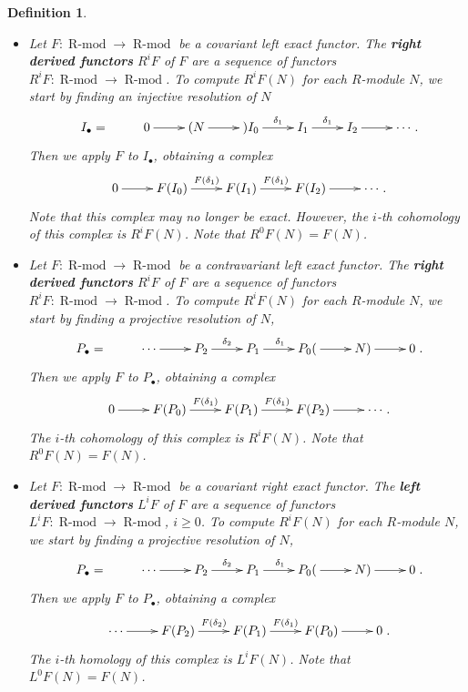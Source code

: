 \documentclass[11pt]{book}
\newtheorem{definition}[theorem]{Definition}
\numberwithin{equation}{section}
\numberwithin{theorem}{chapter}
\theoremstyle{definition}
\newtheorem*{basic properties}{Basic Properties}
\newtheorem*{Important Remark}{Important Remark}
\theoremstyle{remark}
\newcommand{\Rmod}{\operatorname{R-mod}}
\begin{document}
\begin{definition}$\,$

\begin{itemize}
	\item Let $F: \Rmod \longrightarrow \Rmod$ be a covariant left exact functor. The {\bf right derived functors} $R^iF$ of $F$ are a sequence of functors $R^iF\!:  \Rmod \longrightarrow \Rmod$. To compute $R^iF(N)$ for each $R$-module $N$, we start by finding an injective resolution of $N$
	$$\xymatrix{I_\bullet = & 0 \ar[r] & (N \ar[r] &) I_{0} \ar[r]^-{\delta_{1}} & I_1 \ar[r]^{\delta_1} & I_{2} \ar[r] & \cdots}.$$
	Then we apply $F$ to $I_{\bullet}$, obtaining a complex
	$$\xymatrix{0 \ar[r] & F(I_{0}) \ar[r]^-{F(\delta_{1})} & F(I_1) \ar[r]^{F(\delta_1)} & F(I_{2}) \ar[r] & \cdots}.$$
	Note that this complex may no longer be exact. However, the $i$-th cohomology of this complex is $R^iF(N)$. Note that $R^0F(N) = F(N)$.

	
	\item Let $F\!: \Rmod \longrightarrow \Rmod$ be a contravariant left exact functor. The {\bf right derived functors} $R^iF$ of $F$ are a sequence of functors $R^iF\!:  \Rmod \longrightarrow \Rmod$. To compute $R^iF(N)$ for each $R$-module $N$, we start by finding a projective resolution of $N$,
	$$\xymatrix{P_\bullet = & \cdots \ar[r] & P_{2} \ar[r]^-{\delta_{2}} & P_1 \ar[r]^{\delta_1} & P_{0} (\ar[r] & N ) \ar[r] & 0}.$$
	Then we apply $F$ to $P_{\bullet}$, obtaining a complex
	$$\xymatrix{0 \ar[r] & F(P_{0}) \ar[r]^-{F(\delta_{1})} & F(P_1) \ar[r]^{F(\delta_1)} & F(P_{2}) \ar[r] & \cdots}.$$
	The $i$-th cohomology of this complex is $R^iF(N)$. Note that $R^0F(N) = F(N)$.
	
	
	\item Let $F\!: \Rmod \longrightarrow \Rmod$ be a covariant right exact functor. The {\bf left derived functors} $L^iF$ of $F$ are a sequence of functors $L^iF\!:  \Rmod \longrightarrow \Rmod$, $i \geqslant 0$. To compute $R^iF(N)$ for each $R$-module $N$, we start by finding a projective resolution of $N$,
	$$\xymatrix{P_\bullet = & \cdots \ar[r] & P_{2} \ar[r]^-{\delta_{2}} & P_1 \ar[r]^{\delta_1} & P_{0} (\ar[r] & N ) \ar[r] & 0}.$$
	Then we apply $F$ to $P_{\bullet}$, obtaining a complex
	$$\xymatrix{\cdots \ar[r] & F(P_{2}) \ar[r]^-{F(\delta_{2})} & F(P_1) \ar[r]^{F(\delta_1)} & F(P_{0}) \ar[r] & 0}.$$
	The $i$-th homology of this complex is $L^iF(N)$. Note that $L^0F(N) = F(N)$.
	

\end{itemize}
\end{definition}
\end{document}
